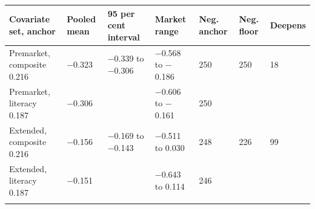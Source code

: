\setlength{\tabcolsep}{2pt}
\begin{tabular}{@{}lllllll@{}}
\toprule
Covariate set, anchor & Pooled mean & 95 per cent interval & Market range & Neg. anchor & Neg. floor & Deepens\\
\midrule
Premarket, composite 0.216 & $-$0.323 & $-$0.339 to $-$0.306 & $-$0.568 to $-$0.186 & 250 & 250 & 18\\
Premarket, literacy 0.187 & $-$0.306 &  & $-$0.606 to $-$0.161 & 250 &  & \\
Extended, composite 0.216 & $-$0.156 & $-$0.169 to $-$0.143 & $-$0.511 to 0.030 & 248 & 226 & 99\\
Extended, literacy 0.187 & $-$0.151 &  & $-$0.643 to 0.114 & 246 &  & \\
\botrule
\end{tabular}
